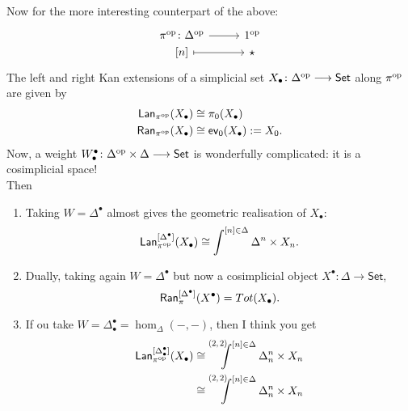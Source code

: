\documentclass[11pt]{amsart}
\begin{document}
\begin{example}
	Now for the more interesting counterpart of the above:
	\[
		\begin{tikzcd}[row sep=0.0em, column sep=2.7em,  ampersand replacement=\&]
			 \pi^{\op}\colon \Delta^{\op}
			\arrow[r]
			\&
			1^{\op}
			\\
			{[n]}
			\arrow[r, mapsto]
			\&
			{\star}
		\end{tikzcd}
	\]%
	The left and right Kan extensions of a simplicial set $X_{\bullet}\colon\Delta^{\mathrm{op}}\longrightarrow\mathsf{Set}$ along $\pi^{\mathrm{op}}$ are given by
	\begin{align*}
		\mathsf{Lan}_{\pi^{\mathrm{op}}}(X_{\bullet}) & \cong \pi_{0}(X_{\bullet})               \\
		\mathsf{Ran}_{\pi^{\mathrm{op}}}(X_{\bullet}) & \cong \mathsf{ev}_{0}(X_{\bullet}) := X_{0}.
	\end{align*}
	Now, a weight $W^{\bullet}_{\bullet}\colon\Delta^{\mathrm{op}}\times\Delta\longrightarrow\mathsf{Set}$ is wonderfully complicated: it is a cosimplicial space!
	\[
	\]
	Then
	\begin{enumerate}
		\item Taking $W=\Delta^{\bullet}$ almost gives the geometric realisation of $X_{\bullet}$:
		      \[
			      \mathsf{Lan}^{\left[\Delta^{\bullet}\right]}_{\pi^{\mathrm{op}}}(X_{\bullet}) \cong \int^{[n]\in\Delta}\Delta^{n}\times X_{n}.
		      \]
		\item Dually, taking again $W=\Delta^{\bullet}$ but now a cosimplicial object $X^{\bullet}\colon\Delta\longrightarrow\mathsf{Set}$,
		      \[
			      \mathsf{Ran}^{\left[\Delta^{\bullet}\right]}_{\pi}(X^{\bullet}) = Tot(X_{\bullet}).
		      \]
		\item If ou take $W=\Delta^{\bullet}_{\bullet}=\hom_{\Delta}(-,-)$, then I think you get
		      \begin{align*}
			      \wLan{\Delta^{\bullet}_{\bullet}}_{\pi^{\op}}(X_{\bullet}) & \cong \pqCoend{2}{2}{[n]\in\Delta}\Delta^{n}_{n}\times X_{n} \\
			                                                                 & \cong \pqCoend{2}{2}{[n]\in\Delta}\Delta^{n}_{n}\times X_{n}
		      \end{align*}
	\end{enumerate}
\end{example}
\end{document}
